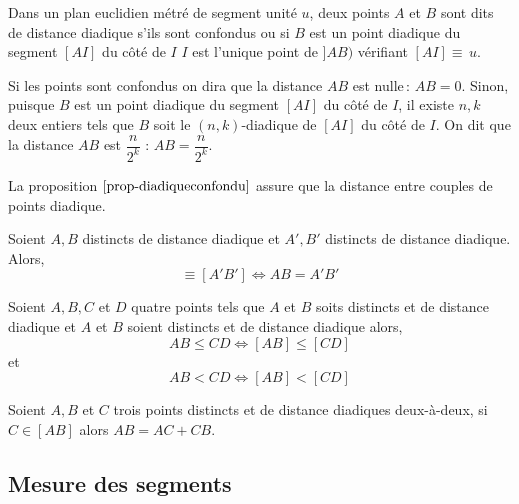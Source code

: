 \begin{defi}
    Dans un plan euclidien métré de segment unité $u$, deux points $A$ et $B$ sont dits de distance diadique s'ils sont confondus ou si $B$ est un point diadique du segment $[AI]$ du côté de $I$  $I$ est l'unique point de $]AB)$ vérifiant $[AI]\equiv \, u$.

    Si les points sont confondus on dira que la distance $AB$ est nulle\,: $AB=0$. Sinon, puisque $B$ est un point diadique du segment $[AI]$ du côté de $I$, il existe $n,k$ deux entiers tels que $B$ soit le $(n,k)$-diadique de $[AI]$ du côté de $I$. On dit que la distance $AB$ est $\dfrac{n}{2^k}$ : $AB=\dfrac{n}{2^k}$.
\end{defi}
\begin{rema}
    La proposition $\ref{prop-diadiqueconfondu}$ assure que la distance entre couples de points diadique.  
\end{rema}
\begin{thm}\label{thm-equivcongrudist}
    Soient $A,B$ distincts de distance diadique et $A',B'$ distincts de distance diadique. Alors,
    \begin{equation*}
        [AB]\equiv[A'B'] \Longleftrightarrow AB = A'B'
    \end{equation*}
\end{thm}
\begin{thm}\label{thm-ordredistancesegmentdiadique}
    Soient $A,B,C$ et $D$ quatre points tels que $A$ et $B$ soits distincts et de distance diadique et $A$ et $B$ soient distincts et de distance diadique alors,
    \begin{equation*}
        AB \leq CD \Longleftrightarrow [AB]\leq[CD]
    \end{equation*}
    et 
    \begin{equation*}
        AB <CD \Longleftrightarrow [AB]<[CD]
    \end{equation*}
\end{thm}
\begin{prop}\label{prop-addlongdiadique}
    Soient $A,B$ et $C$ trois points distincts et de distance diadiques deux-à-deux, si $C\in [AB]$ alors $AB = AC + CB$.
\end{prop}

        \subsection{Mesure des segments}

